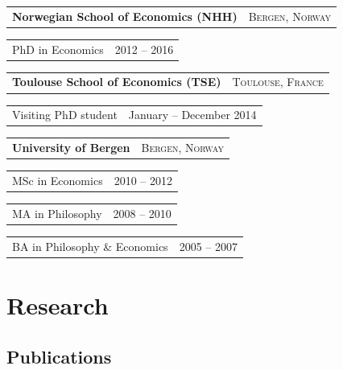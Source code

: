 \documentclass[10pt,a4paper]{article}
\makeatletter
\newcommand{\org}[2]{%
  \vspace{0.42em}%
  \begin{tabularx}{\linewidth}{@{}Xr@{}}
    \textbf{#1} & \textsc{\small #2}
  \end{tabularx}\par\vspace{0.15em}}
\newcommand{\role}[2]{%
  \hspace*{1.1em}%
  \begin{tabularx}{\dimexpr\linewidth-1.1em}{@{}Xr@{}}
    #1 & {\small #2}
  \end{tabularx}\par\vspace{0.1em}}
\makeatother
\begin{document}
\org{Norwegian School of Economics (NHH)}{Bergen, Norway}
\role{PhD in Economics}{2012 -- 2016}

\org{Toulouse School of Economics (TSE)}{Toulouse, France}
\role{Visiting PhD student}{January -- December 2014}

\org{University of Bergen}{Bergen, Norway}
\role{MSc in Economics}{2010 -- 2012}
\role{MA in Philosophy}{2008 -- 2010}
\role{BA in Philosophy \& Economics}{2005 -- 2007}

\section{Research}

\subsection*{Publications}
\end{document}
